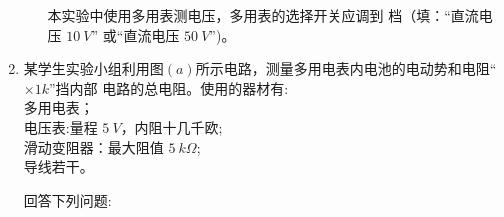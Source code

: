 \begin{enumerate}
\begin{enumerate}
本实验中使用多用表测电压，多用表的选择开关应调到 \underlinegap 档（填：“直流电压 $ 10 \ V $”
或“直流电压 $ 50 \ V $”)。




\end{enumerate}


\item 
{}
某学生实验小组利用图$ (a) $所示电路，测量多用电表内电池的电动势和电阻“$ \times 1k $”挡内部
电路的总电阻。使用的器材有:\\
多用电表；\\
电压表:量程 $ 5 \ V $，内阻十几千欧;\\
滑动变阻器：最大阻值 $ 5 \ k\Omega $;\\
导线若干。

回答下列问题:
\begin{figure}[h!]
\centering
\begin{subfigure}{0.4\linewidth}
\centering
 
\caption{}\label{}
\end{subfigure}
\begin{subfigure}{0.4\linewidth}
\centering
 
\caption{}\label{}
\end{subfigure}
\begin{subfigure}{0.4\linewidth}
\centering
 
\caption{}\label{}
\end{subfigure}
\begin{subfigure}{0.4\linewidth}
\centering
 
\caption{}\label{}
\end{subfigure}


\end{figure}
\end{enumerate}
